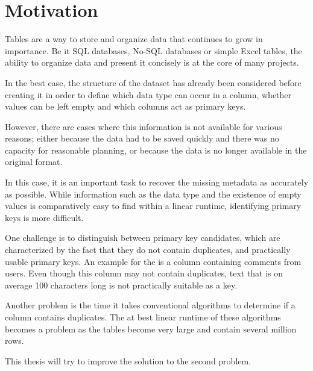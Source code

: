 \chapter{Motivation}
Tables are a way to store and organize data that continues to grow in importance. Be it SQL databases, No-SQL databases or simple Excel tables, the ability to organize data and present it concisely is at the core of many projects.

In the best case, the structure of the dataset has already been considered before creating it in order to define which data type can occur in a column, whether values can be left empty and which columns act as primary keys.

However, there are cases where this information is not available for various reasons; either because the data had to be saved quickly and there was no capacity for reasonable planning, or because the data is no longer available in the original format. %

In this case, it is an important task to recover the missing metadata as accurately as possible. While information such as the data type and the existence of empty values is comparatively easy to find within a linear runtime, identifying primary keys is more difficult.

One challenge is to distinguish between primary key candidates, which are characterized by the fact that they do not contain duplicates, and practically usable primary keys. An example for the is a column containing comments from users. Even though this column may not contain duplicates, text that is on average 100 characters long is not practically suitable as a key.

Another problem is the time it takes conventional algorithms to determine if a column contains duplicates. The at best linear runtime of these algorithms becomes a problem as the tables become very large and contain several million rows.

This thesis will try to improve the solution to the second problem. %
